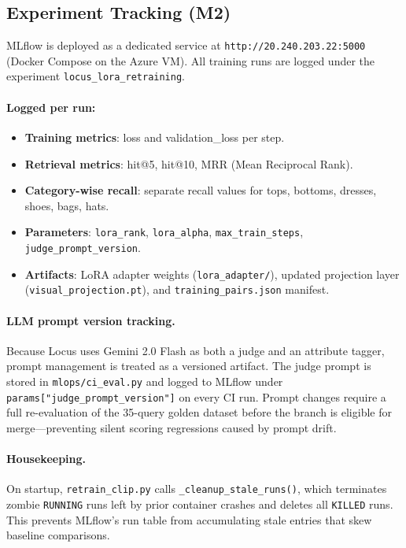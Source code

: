 \documentclass[12pt]{article}
\begin{document}
\subsection{Experiment Tracking (M2)}

MLflow is deployed as a dedicated service at \texttt{http://20.240.203.22:5000} (Docker Compose on the Azure VM). All training runs are logged under the experiment \texttt{locus\_lora\_retraining}.

\paragraph{Logged per run:}
\begin{itemize}[leftmargin=*, itemsep=1pt]
    \item \textbf{Training metrics}: loss and validation\_loss per step.
    \item \textbf{Retrieval metrics}: hit@5, hit@10, MRR (Mean Reciprocal Rank).
    \item \textbf{Category-wise recall}: separate recall values for tops, bottoms, dresses, shoes, bags, hats.
    \item \textbf{Parameters}: \texttt{lora\_rank}, \texttt{lora\_alpha}, \texttt{max\_train\_steps}, \texttt{judge\_prompt\_version}.
    \item \textbf{Artifacts}: LoRA adapter weights (\texttt{lora\_adapter/}), updated projection layer (\texttt{visual\_projection.pt}), and \texttt{training\_pairs.json} manifest.
\end{itemize}

\paragraph{LLM prompt version tracking.}
Because Locus uses Gemini 2.0 Flash as both a judge and an attribute tagger, prompt management is treated as a versioned artifact. The judge prompt is stored in \texttt{mlops/ci\_eval.py} and logged to MLflow under \texttt{params["judge\_prompt\_version"]} on every CI run. Prompt changes require a full re-evaluation of the 35-query golden dataset before the branch is eligible for merge---preventing silent scoring regressions caused by prompt drift.

\paragraph{Housekeeping.}
On startup, \texttt{retrain\_clip.py} calls \texttt{\_cleanup\_stale\_runs()}, which terminates zombie \texttt{RUNNING} runs left by prior container crashes and deletes all \texttt{KILLED} runs. This prevents MLflow's run table from accumulating stale entries that skew baseline comparisons.
\end{document}
